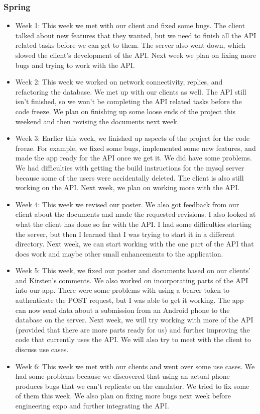 \documentclass[onecolumn, draftclsnofoot,10pt, compsoc]{IEEEtran}
\begin{document}
 \subsubsection{Spring}
 \begin{itemize}
     \item Week 1: This week we met with our client and fixed some bugs. The client talked about new features that they wanted, but we need to finish all the API related tasks before we can get to them. The server also went down, which slowed the client's development of the API. Next week we plan on fixing more bugs and trying to work with the API.
     \item Week 2: This week we worked on network connectivity, replies,  and refactoring the database. We met up with our clients as well. The API still isn't finished, so we won't be completing the API related tasks before the code freeze. We plan on finishing up some loose ends of the project this weekend and then revising the documents next week.
     \item Week 3: Earlier this week, we finished up aspects of the project for the code freeze. For example, we fixed some bugs, implemented some new features, and made the app ready for the API once we get it. We did have some problems. We had difficulties with getting the build instructions for the mysql server because some of the users were accidentally deleted. The client is also still working on the API. Next week, we plan on working more with the API.
     \item Week 4: This week we revised our poster. We also got feedback from our client about the documents and made the requested revisions. I also looked at what the client has done so far with the API. I had some difficulties starting the server, but then I learned that I was trying to start it in a different directory. Next week, we can start working with the one part of the API that does work and maybe other small enhancements to the application.
     \item Week 5: This week, we fixed our poster and documents based on our clients' and Kirsten's comments. We also worked on incorporating parts of the API into our app. There were some problems with using a bearer token to authenticate the POST request, but I was able to get it working. The app can now send data about a submission from an Android phone to the database on the server. Next week, we will try working with more of the API (provided that there are more parts ready for us) and further improving the code that currently uses the API. We will also try to meet with the client to discuss use cases.
     \item Week 6: This week we met with our clients and went over some use cases. We had some problems because we discovered that using an actual phone produces bugs that we can't replicate on the emulator. We tried to fix some of them this week. We also plan on fixing more bugs next week before engineering expo and further integrating the API.
 \end{itemize}
 
\end{document}

